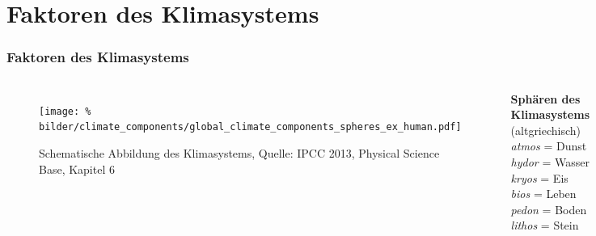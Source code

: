\section{Faktoren des Klimasystems}


\begin{frame}
  \frametitle{Faktoren des Klimasystems}
  \begin{columns}
	\begin{figure}
	 	\centering
	 	\texttt{[image: \%
        bilder/climate\_components/global\_climate\_components\_spheres\_ex\_human.pdf]}
	 	\caption{Schematische Abbildung des Klimasystems, Quelle: IPCC 2013, Physical Science Base, Kapitel 6} %
	\end{figure}
  \textbf{Sphären des Klimasystems}\\
  (altgriechisch)\\[1em]
  \textit{atmos} = Dunst\\
  \textit{hydor} = Wasser\\
  \textit{kryos} = Eis\\
  \textit{bios} = Leben\\
  \textit{pedon} = Boden\\
  \textit{lithos} = Stein
	\end{columns}


\end{frame}
